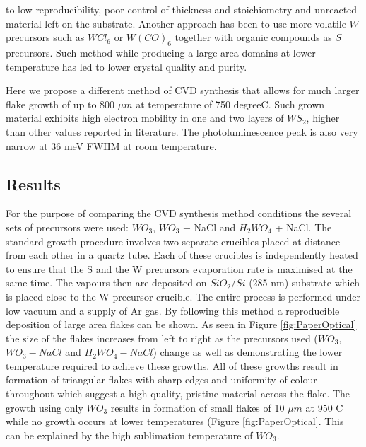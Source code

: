 \documentclass[12pt]{article}
\begin{document}
to low reproducibility, poor control of thickness and stoichiometry and unreacted material left on the substrate. Another approach has been to use more volatile $W$ precursors such as $WCl_6$\cite{Carmalt2003} or $W(CO)_6$\cite{Kang2015}\cite{Eichfeld2015} together with organic compounds as $S$ precursors. Such method while producing a large area domains at lower temperature has led to lower crystal quality and purity.

Here we propose a different method of CVD synthesis that allows for much larger flake growth of up to 800 $\mu m$ at temperature of 750 {degree}C. Such grown material exhibits high electron mobility in one and two layers of $WS_2$, higher than other values reported in literature. The photoluminescence peak is also very narrow at 36 meV FWHM at room temperature. 

	\subsection{Results}
	
For the purpose of comparing the CVD synthesis method conditions the several sets of precursors were used: $WO_3$, $WO_3$ + NaCl and $H_2WO_4$ + NaCl. The standard growth procedure involves two separate crucibles placed at distance from each other in a quartz tube. Each of these crucibles is independently heated to ensure that the S and the W precursors evaporation rate is maximised at the same time. The vapours then are deposited on $SiO_2/Si$ (285 nm) substrate which is placed close to the W precursor crucible. The entire process is performed under low vacuum and a supply of Ar gas. By following this method a reproducible deposition of large area flakes can be shown. As seen in Figure \ref{fig:PaperOptical} the size of the flakes increases from left to right as the precursors used ($WO_3$, $WO_3-NaCl$ and $H_2WO_4-NaCl$) change as well as demonstrating the lower temperature required to achieve these growths. All of these growths result in formation of triangular flakes with sharp edges and uniformity of colour throughout which suggest a high quality, pristine material across the flake. 
The growth using only $WO_3$ results in formation of small flakes of 10 $\mu m$ at 950 {\degree}C while no growth occurs at lower temperatures (Figure \ref{fig:PaperOptical}. This can be explained by the high sublimation temperature of $WO_3$.
\end{document}
